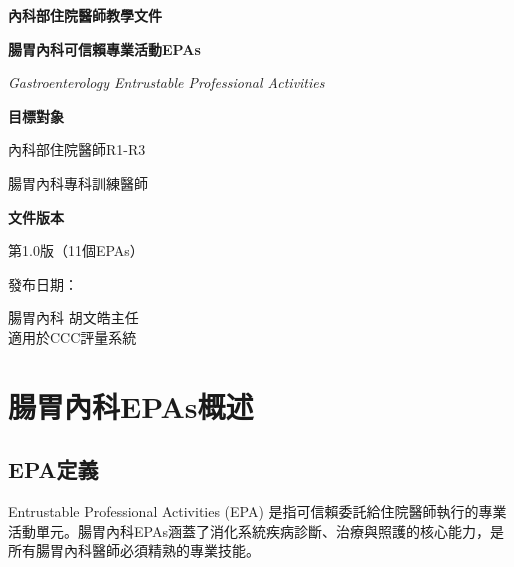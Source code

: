 \documentclass[12pt,a4paper]{article}
\newcommand{\mydate}{\DTMtoday}
\begin{document}
\begin{titlepage}
    \centering
    {\LARGE\textcolor{gi_green}{\textbf{內科部住院醫師教學文件}}\par}
    \vspace{1cm}
    {\huge\bfseries 腸胃內科可信賴專業活動EPAs\par}
    \vspace{0.5cm}
    {\Large\textcolor{gi_blue}{\textit{Gastroenterology Entrustable Professional Activities}}\par}
    \vspace{1cm}
    
    \begin{tcolorbox}[
        colback=gi_blue!5!white,
        colframe=gi_blue,
        width=0.8\textwidth,
        arc=10pt,
        boxrule=1pt
    ]
    \centering
    {\large\textbf{目標對象}\par}
    \vspace{0.3cm}
    內科部住院醫師R1-R3\par
    腸胃內科專科訓練醫師\par
    \vspace{0.5cm}
    {\large\textbf{文件版本}\par}
    \vspace{0.3cm}
    第1.0版（11個EPAs）\par
    發布日期：\mydate\par
    \end{tcolorbox}

    \vfill
    
    {\large 腸胃內科 胡文皓主任 \\
    適用於CCC評量系統\par}
    
    \vspace{0.5cm}
\end{titlepage}

\newpage
\tableofcontents
\newpage

\section{腸胃內科EPAs概述}

\subsection{EPA定義}
Entrustable Professional Activities (EPA) 是指可信賴委託給住院醫師執行的專業活動單元。腸胃內科EPAs涵蓋了消化系統疾病診斷、治療與照護的核心能力，是所有腸胃內科醫師必須精熟的專業技能。
\end{document}
